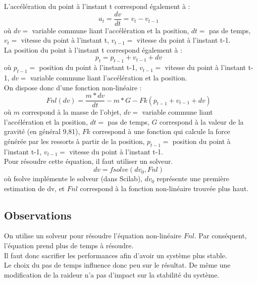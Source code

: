 \documentclass[a4paper]{article}
\begin{document}
L'accélération du point à l'instant t correspond également à :
\begin{equation}
  a_t = \frac{dv}{dt} = v_t - v_{t-1}
\end{equation}
où $dv =$ variable commune liant l'accélération et la position, $dt =$ pas de temps, $v_t =$ vitesse du point à l'instant t, $v_{t-1} =$ vitesse du point à l'instant t-1.\\

La position du point à l'instant t correspond également à :
\begin{equation}
  p_t = p_{t-1} + v_{t-1} + dv
\end{equation}
où $p_{t-1} =$ position du point à l'instant t-1, $v_{t-1} =$ vitesse du point à l'instant t-1, $dv =$ variable commune liant l'accélération et la position.\\

On dispose donc d'une fonction non-linéaire :
\begin{equation}
  Fnl(dv) = \frac{m * dv}{dt} - m * G - Fk( p_{t-1} + v_{t-1} + dv )
\end{equation}
où $m$ correspond à la masse de l'objet, $dv =$ variable commune liant l'accélération et la position, $dt =$ pas de temps, $G$ correspond à la valeur de la gravité (en général 9,81), $Fk$ correspond à une fonction qui calcule la force générée par les ressorts à partir de la position, $p_{t-1} =$ position du point à l'instant t-1, $v_{t-1} =$ vitesse du point à l'instant t-1.\\

Pour résoudre cette équation, il faut utiliser un solveur.
\begin{equation}
  dv = fsolve(dv_0, Fnl)
\end{equation}
où fsolve implémente le solveur (dans Scilab), $dv_0$ représente une première estimation de dv, et $Fnl$ correspond à la fonction non-linéaire trouvée plus haut.

\subsection{Observations}

On utilise un solveur pour résoudre l'équation non-linéaire $Fnl$.
Par conséquent, l'équation prend plus de temps à résoudre.\\
Il faut donc sacrifier les performances afin d'avoir un système plus stable.\\

Le choix du pas de temps influence donc peu sur le résultat. De même une modification de la raideur n'a pas d'impact sur la stabilité du système.
\end{document}
